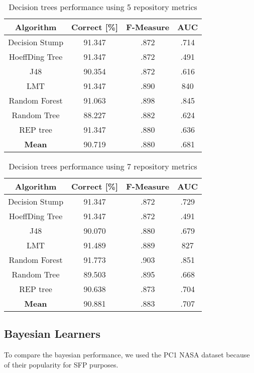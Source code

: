 \begin{table}[h!]
\centering
\begin{tabular}{ |c|c|c|c| }
 \hline
 \textbf{Algorithm} & \textbf{Correct [\%]} & \textbf{F-Measure} & \textbf{AUC}  \\
 \hline
 Decision Stump & 91.347 & .872 & .714    \\
 \hline
 HoeffDing Tree &  91.347 & .872 & .491   \\
 \hline
  J48 & 90.354 & .872 & .616\\
 \hline
  LMT & 91.347 & .890 & 840  \\
 \hline
  Random Forest & 91.063 & .898 & .845 \\
 \hline
  Random Tree & 88.227 & .882 & .624 \\
 \hline
 REP tree  & 91.347 & .880 & .636 \\
 \hline
 \textbf{Mean}  & 90.719 & .880 & .681 \\
 \hline

\end{tabular}
\caption{Decision trees performance using 5 repository metrics}
\label{table:DT_5}
\end{table}

\begin{table}[h!]
\centering
\begin{tabular}{ |c|c|c|c| }
 \hline
 \textbf{Algorithm} & \textbf{Correct [\%]} & \textbf{F-Measure} & \textbf{AUC}  \\
 \hline
 Decision Stump & 91.347 & .872 & .729    \\
 \hline
 HoeffDing Tree &  91.347 & .872 & .491   \\
 \hline
  J48 & 90.070 & .880 & .679\\
 \hline
  LMT & 91.489 & .889 & 827  \\
 \hline
  Random Forest & 91.773 & .903 & .851 \\
 \hline
  Random Tree & 89.503 & .895 & .668 \\
 \hline
 REP tree  & 90.638 & .873 & .704 \\
 \hline
 \textbf{Mean}  & 90.881 & .883 & .707 \\
 \hline

\end{tabular}
\caption{Decision trees performance using 7 repository metrics}
\label{table:DT_7}
\end{table}


\subsection{Bayesian Learners}
To compare the bayesian performance, we used the PC1 NASA dataset because of their popularity for SFP purposes.

